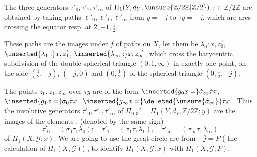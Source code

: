 The three  generators
 $\tau'_0,\tau'_1,\tau'_\infty$
of $\Pi_1(Y,d_Y,
\unsure{\mathbb Z/2\mathbb Z|\mathbb Z/2})$
 $\tau\in\mathbb Z/2\mathbb Z$
are obtained by taking paths $\ell'_0,\ell'_1,\ell'_\infty$
from  $y=-\bar j$ to
 $\tau y=-j$, which are 
 arcs crossing the equator resp. at $2,-1,\frac12$.



These paths are the images under $f$ of paths
on $X$, let them be $\lambda_0:\overrightarrow{x,z_0}$,
$\inserted{\lambda_1:}\overrightarrow{x,z_1}$,
$\inserted{\lambda_\infty:}\overrightarrow{x,z_\infty}$,
which  cross the barycentric subdivision of the double
spherical triangle $(0,1,\infty)$ in exactly one point,
  on the side
$(\frac12,-\bar j)$, $(-\bar j,0)$ and $(0,\frac12)$
of the spherical triangle $(0,\frac12,-\bar j)$.


The points  $z_0,z_1,z_\infty$ over
$\tau y$ are  of the form
$\inserted{g_0x=}\dot\sigma_\infty\dot\tau x$,
$\inserted{g_1x=}\dot\sigma_0\dot\tau x$,
$\inserted{g_\infty x=}\deleted{\unsure{\dot\sigma_\infty}}\dot\tau x$
.
Thus the involutive generators
$\tau'_0,\tau'_1,\tau'_\infty$ of
$\widetilde\Pi_{0,3}'=\Pi_1(Y,d_Y,\mathbb Z/2\mathbb Z;y)$
are the images of the elements
,
(denoted by the same sign)
\[
\tau'_0=(\dot\sigma_0\dot\tau,\lambda_0);\quad
\tau'_1=(\dot\sigma_1\dot\tau,\lambda_1),\quad
\tau'_\infty=(\dot\sigma_\infty\dot\tau,\lambda_\infty)
\]
of $\Pi_1(X,\mathcal G;x)$.
We are going to use the great circle arc \inserted{$\ell$}
from  $-\bar j=P$
( 
  the calculation of $\Pi_1(X,\mathcal G)$)
, to identify $\Pi_1(X,\mathcal G;x)$
with $\Pi_1(X,\mathcal G;P)$.

